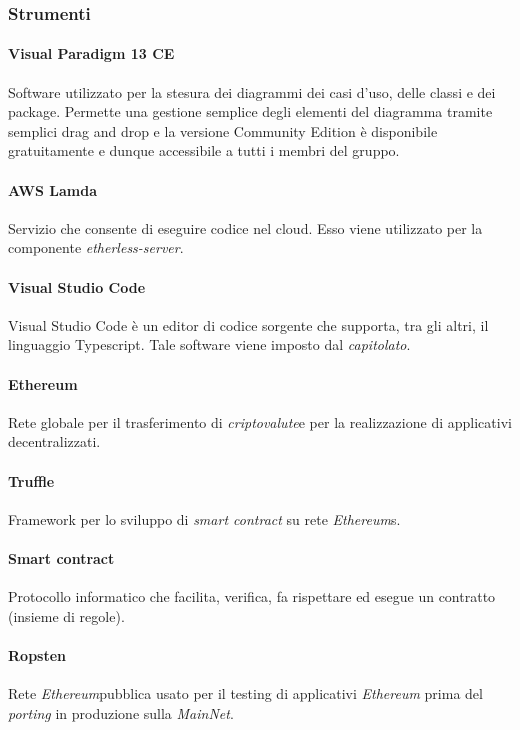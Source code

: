 \subsubsection{Strumenti}
\paragraph{Visual Paradigm 13 CE}
Software utilizzato per la stesura dei diagrammi dei casi d'uso, delle classi e dei package. Permette una gestione semplice degli elementi del diagramma tramite semplici drag and drop e la versione Community Edition è disponibile gratuitamente e dunque accessibile a tutti i membri del gruppo.

\paragraph{AWS Lamda}
Servizio che consente di eseguire codice nel cloud\glos. Esso viene utilizzato per la componente \textit{etherless-server}.

\paragraph{Visual Studio Code}
Visual Studio Code è un editor di codice sorgente che supporta, tra gli altri, il linguaggio Typescript. Tale software viene imposto dal \textit{capitolato\glos}.

\paragraph{Ethereum\glo}
Rete globale per il trasferimento di \textit{criptovalute}\glo e per la realizzazione di applicativi decentralizzati.

\paragraph{Truffle}
Framework per lo sviluppo di \textit{smart contract\glo} su rete \textit{Ethereum\glo}s.

\paragraph{Smart contract\glo}
Protocollo informatico che facilita, verifica, fa rispettare ed esegue un
contratto (insieme di regole).

\paragraph{Ropsten}
Rete \textit{Ethereum}\glo pubblica usato per il testing di applicativi \textit{Ethereum\glo} prima
del \textit{porting\glo} in produzione sulla \textit{MainNet\glos}.

